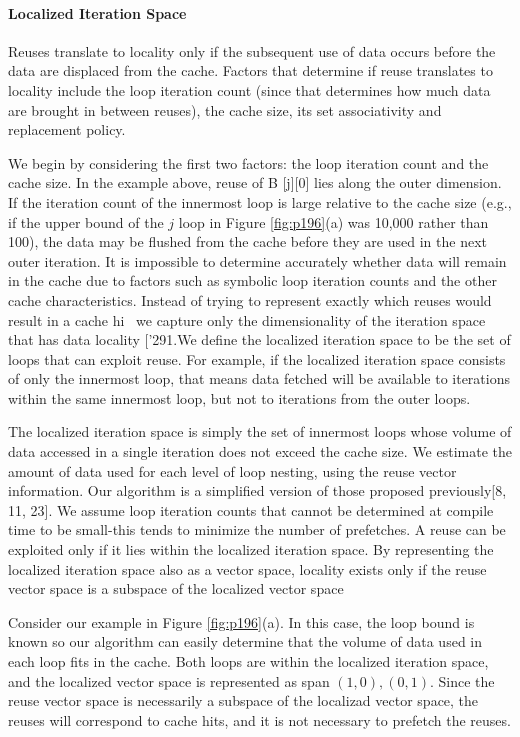 \paragraph{Localized Iteration Space}


Reuses translate to locality only if the subsequent use of data occurs
before the data are displaced from the cache. Factors that determine
if reuse translates to locality include the loop iteration count (since
that determines how much data are brought in between reuses), the
cache size, its set associativity and replacement policy.

We begin by considering the first two factors: the loop iteration
count and the cache size. In the example above, reuse of B [j][0]
lies along the outer dimension. If the iteration count of the innermost loop is large relative to the cache size (e.g., if the upper bound
of the $j$ loop in Figure \ref{fig:p196}(a) was 10,000 rather than 100), the data
may be flushed from the cache before they are used in the next outer
iteration. It is impossible to determine accurately whether data will
remain in the cache due to factors such as symbolic loop iteration
counts and the other cache characteristics. Instead of trying to represent exactly which reuses would result in a cache hi~ we capture
only the dimensionality of the iteration space that has data locality [’291.We define the localized iteration space to be the set of
loops that can exploit reuse. For example, if the localized iteration
space consists of only the innermost loop, that means data fetched
will be available to iterations within the same innermost loop, but
not to iterations from the outer loops.

The localized iteration space is simply the set of innermost loops
whose volume of data accessed in a single iteration does not exceed
the cache size. We estimate the amount of data used for each level
of loop nesting, using the reuse vector information. Our algorithm
is a simplified version of those proposed previously[8, 11, 23]. We
assume loop iteration counts that cannot be determined at compile
time to be small-this tends to minimize the number of prefetches. A reuse can be exploited
only if it lies within the localized iteration space. By representing
the localized iteration space also as a vector space, locality exists
only if the reuse vector space is a subspace of the localized vector
space

Consider our example in Figure \ref{fig:p196}(a). In this case, the loop bound
is known so our algorithm can easily determine that the volume of
data used in each loop fits in the cache. Both loops are within
the localized iteration space, and the localized vector space is represented as span 
${( 1, 0), (0, 1)}$. Since the reuse vector space is necessarily 
a subspace of the localizad vector space, the reuses will
correspond to cache hits, and it is not necessary to prefetch the
reuses.

